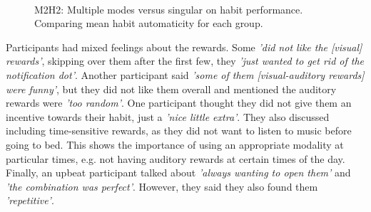 
\begin{figure}
  \centering
  \caption{M2H2: Multiple modes versus singular on habit performance. Comparing mean habit automaticity for each group.}~\label{fig:m2_h2}
\end{figure}

Participants had mixed feelings about the rewards. Some \textit{'did not like the [visual] rewards'}, skipping over them after the first few, they \textit{'just wanted to get rid of the notification dot'}. Another participant said \textit{'some of them [visual-auditory rewards] were funny'}, but they did not like them overall and mentioned the auditory rewards were \textit{'too random'}. One participant thought they did not give them an incentive towards their habit, just a \textit{'nice little extra'}. They also discussed including time-sensitive rewards, as they did not want to listen to music before going to bed. This shows the importance of using an appropriate modality at particular times, e.g. not having auditory rewards at certain times of the day. Finally, an upbeat participant talked about \textit{'always wanting to open them'} and \textit{'the combination was perfect'}. However, they said they also found them \textit{'repetitive'}.


